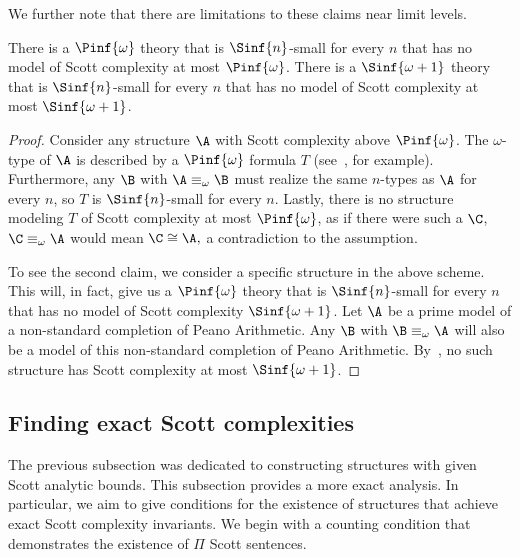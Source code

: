 \documentclass[10pt,a4paper]{amsart}
\renewcommand{\-}{\text{-}}
\begin{document}
We further note that there are limitations to these claims near limit levels.

\begin{proposition}
There is a $\Pinf{\omega}$ theory that is $\Sinf{n}$-small for every $n$ that has no model of Scott complexity at most $\Pinf{\omega}$.
There is a $\Sinf{\omega+1}$ theory that is $\Sinf{n}$-small for every $n$ that has no model of Scott complexity at most $\Sinf{\omega+1}$.
\end{proposition}

\begin{proof}
Consider any structure $\A$ with Scott complexity above $\Pinf{\omega}$.
The $\omega$-type of $\A$ is described by a $\Pinf{\omega}$ formula $T$ (see~\cite{CGHT}, for example).
Furthermore, any $\B$ with $\A\equiv_\omega\B$ must realize the same $n$-types as $\A$ for every $n$, so $T$ is $\Sinf{n}$-small for every $n$.
Lastly, there is no structure modeling $T$ of Scott complexity at most $\Pinf{\omega}$, as if there were such a $\C$, $\C\equiv_\omega \A$ would mean $\C\cong\A,$ a contradiction to the assumption.

To see the second claim, we consider a specific structure in the above scheme.
This will, in fact, give us a $\Pinf{\omega}$ theory that is $\Sinf{n}$-small for every $n$ that has no model of Scott complexity  $\Sinf{\omega+1}$.
Let $\A$ be a prime model of a non-standard completion of Peano Arithmetic.
Any $\B$ with $\B\equiv_\omega \A$ will also be a model of this non-standard completion of Peano Arithmetic.
By~\cite{GLRS}, no such structure has Scott complexity at most $\Sinf{\omega+1}$.
\end{proof}

\subsection{Finding exact Scott complexities}\label{sec:exactSC}

The previous subsection was dedicated to constructing structures with given Scott analytic bounds.
This subsection provides a more exact analysis.
In particular, we aim to give conditions for the existence of structures that achieve exact Scott complexity invariants.
We begin with a counting condition that demonstrates the existence of $\Pi$ Scott sentences.
\end{document}

